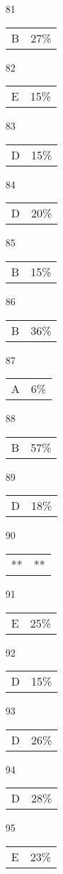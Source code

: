 \documentclass[12pt]{article}
\begin{document}
\begin{multicols}{5}
\begin{enumerate}
\item[81] \begin{tabular}{cc} B & 27\%\end{tabular}
\item[82] \begin{tabular}{cc} E & 15\%\end{tabular}
\item[83] \begin{tabular}{cc} D & 15\%\end{tabular}
\item[84] \begin{tabular}{cc} D & 20\%\end{tabular}
\item[85] \begin{tabular}{cc} B & 15\%\end{tabular}
\item[]
\item[86] \begin{tabular}{cc} B & 36\%\end{tabular}
\item[87] \begin{tabular}{cc} A & 6\%\end{tabular}
\item[88] \begin{tabular}{cc} B & 57\%\end{tabular}
\item[89] \begin{tabular}{cc} D & 18\%\end{tabular}
\item[90] \begin{tabular}{cc} ** & **\end{tabular}
\item[]
\item[91] \begin{tabular}{cc} E & 25\%\end{tabular}
\item[92] \begin{tabular}{cc} D & 15\%\end{tabular}
\item[93] \begin{tabular}{cc} D & 26\%\end{tabular}
\item[94] \begin{tabular}{cc} D & 28\%\end{tabular}
\item[95] \begin{tabular}{cc} E & 23\%\end{tabular}

\end{enumerate}
\end{multicols}
\end{document}
